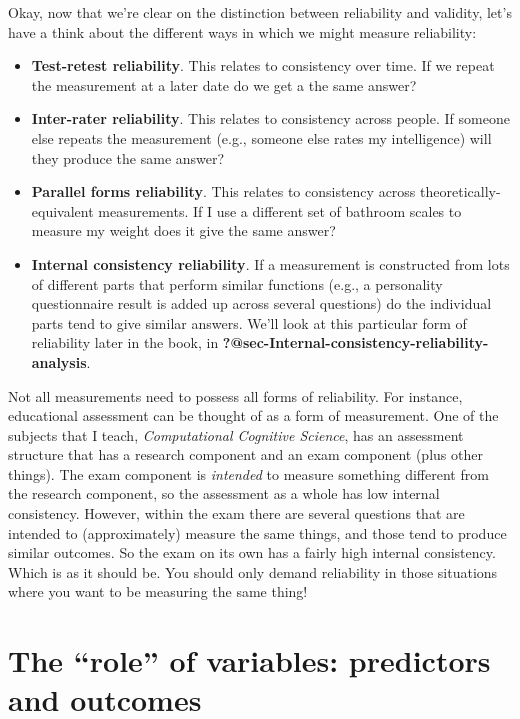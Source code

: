 \documentclass[
  letterpaper,
]{book}
\providecommand{\tightlist}{%
  \setlength{\itemsep}{0pt}\setlength{\parskip}{0pt}}\usepackage{longtable,booktabs,array}
\begin{document}
Okay, now that we're clear on the distinction between reliability and
validity, let's have a think about the different ways in which we might
measure reliability:

\begin{itemize}
\tightlist
\item
  \textbf{Test-retest reliability}. This relates to consistency over
  time. If we repeat the measurement at a later date do we get a the
  same answer?
\item
  \textbf{Inter-rater reliability}. This relates to consistency across
  people. If someone else repeats the measurement (e.g., someone else
  rates my intelligence) will they produce the same answer?
\item
  \textbf{Parallel forms reliability}. This relates to consistency
  across theoretically-equivalent measurements. If I use a different set
  of bathroom scales to measure my weight does it give the same answer?
\item
  \textbf{Internal consistency reliability}. If a measurement is
  constructed from lots of different parts that perform similar
  functions (e.g., a personality questionnaire result is added up across
  several questions) do the individual parts tend to give similar
  answers. We'll look at this particular form of reliability later in
  the book, in \textbf{?@sec-Internal-consistency-reliability-analysis}.
\end{itemize}

Not all measurements need to possess all forms of reliability. For
instance, educational assessment can be thought of as a form of
measurement. One of the subjects that I teach, \emph{Computational
Cognitive Science}, has an assessment structure that has a research
component and an exam component (plus other things). The exam component
is \emph{intended} to measure something different from the research
component, so the assessment as a whole has low internal consistency.
However, within the exam there are several questions that are intended
to (approximately) measure the same things, and those tend to produce
similar outcomes. So the exam on its own has a fairly high internal
consistency. Which is as it should be. You should only demand
reliability in those situations where you want to be measuring the same
thing!

\hypertarget{the-role-of-variables-predictors-and-outcomes}{%
\section{The ``role'' of variables: predictors and
outcomes}\label{the-role-of-variables-predictors-and-outcomes}}
\end{document}
